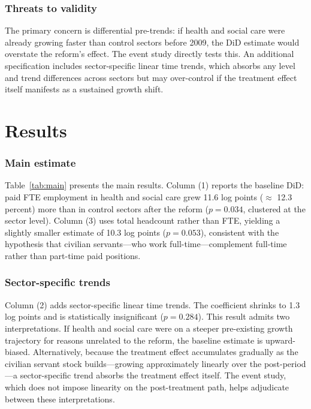 \documentclass[12pt]{article}
\begin{document}
\subsubsection*{Threats to validity} The primary concern is differential pre-trends: if health and social care were already growing faster than control sectors before 2009, the DiD estimate would overstate the reform's effect. The event study directly tests this. An additional specification includes sector-specific linear time trends, which absorbs any level and trend differences across sectors but may over-control if the treatment effect itself manifests as a sustained growth shift.

\section{Results}

\subsubsection*{Main estimate} Table~\ref{tab:main} presents the main results. Column (1) reports the baseline DiD: paid FTE employment in health and social care grew 11.6 log points ($\approx$ 12.3 percent) more than in control sectors after the reform ($p = 0.034$, clustered at the sector level). Column (3) uses total headcount rather than FTE, yielding a slightly smaller estimate of 10.3 log points ($p = 0.053$), consistent with the hypothesis that civilian servants---who work full-time---complement full-time rather than part-time paid positions.

\subsubsection*{Sector-specific trends} Column (2) adds sector-specific linear time trends. The coefficient shrinks to 1.3 log points and is statistically insignificant ($p = 0.284$). This result admits two interpretations. If health and social care were on a steeper pre-existing growth trajectory for reasons unrelated to the reform, the baseline estimate is upward-biased. Alternatively, because the treatment effect accumulates gradually as the civilian servant stock builds---growing approximately linearly over the post-period---a sector-specific trend absorbs the treatment effect itself. The event study, which does not impose linearity on the post-treatment path, helps adjudicate between these interpretations.
\end{document}
